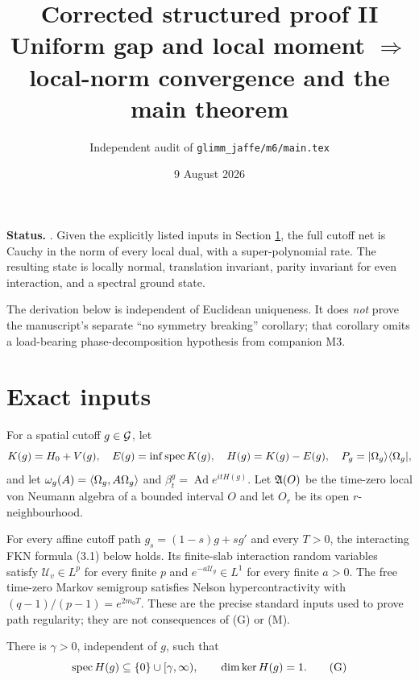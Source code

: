 \documentclass[11pt,a4paper]{article}
\title{Corrected structured proof II\\[3pt]
Uniform gap and local moment $\Longrightarrow$ local-norm convergence and the main theorem}
\author{Independent audit of \texttt{glimm\_jaffe/m6/main.tex}}
\date{9 August 2026}
\begin{document}
\maketitle

\begin{resultbox}
\textbf{Status.} \Conditional.  Given the explicitly listed inputs in Section
\ref{sec:inputs}, the full cutoff net is Cauchy in the norm of every local dual,
with a super-polynomial rate.  The resulting state is locally normal, translation
invariant, parity invariant for even interaction, and a spectral ground state.

The derivation below is independent of Euclidean uniqueness.  It does \emph{not}
prove the manuscript's separate ``no symmetry breaking'' corollary; that corollary
omits a load-bearing phase-decomposition hypothesis from companion M3.
\end{resultbox}

\tableofcontents

\section{Exact inputs}\label{sec:inputs}

For a spatial cutoff $g\in\mathcal G$, let
\[
 K(g)=H_0+V(g),\quad E(g)=\inf\operatorname{spec} K(g),\quad
 H(g)=K(g)-E(g),\quad P_g=|\Omega_g\rangle\langle\Omega_g|,
\]
and let $\omega_g(A)=\langle \Omega_g,A\Omega_g\rangle$ and
$\beta_t^g=\operatorname{Ad}e^{itH(g)}$.  Let $\mathfrak A(O)$ be the time-zero local
von Neumann algebra of a bounded interval $O$ and let $O_r$ be its open
$r$-neighbourhood.

\begin{assumption}\label{ass:F}
For every affine cutoff path $g_s=(1-s)g+sg'$ and every $T>0$, the interacting
FKN formula (3.1) below holds.  Its finite-slab interaction random variables satisfy
$\mathcal U_v\in L^p$ for every finite $p$ and
$e^{-a\mathcal U_g}\in L^1$ for every finite $a>0$.  The free time-zero Markov
semigroup satisfies Nelson hypercontractivity with
$(q-1)/(p-1)=e^{2m_0T}$.  These are the precise standard inputs used to prove path
regularity; they are not consequences of (G) or (M).
\end{assumption}

\begin{assumption}\label{ass:G}
There is $\gamma>0$, independent of $g$, such that
\[
 \operatorname{spec} H(g)\subseteq\{0\}\cup[\gamma,\infty),
 \qquad \dim\ker H(g)=1.                                           \tag{G}
\]
\end{assumption}
\end{document}

